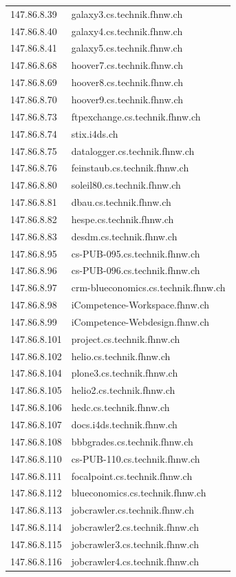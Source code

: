 \documentclass[11pt,a4paper]{scrartcl}
\begin{document}
\begin{longtable}{p{2.5cm}|p{7cm}}
	147.86.8.39 & galaxy3.cs.technik.fhnw.ch \\
	147.86.8.40 & galaxy4.cs.technik.fhnw.ch \\
	147.86.8.41 & galaxy5.cs.technik.fhnw.ch \\
	147.86.8.68 & hoover7.cs.technik.fhnw.ch \\
	147.86.8.69 & hoover8.cs.technik.fhnw.ch \\
	147.86.8.70 & hoover9.cs.technik.fhnw.ch \\
	147.86.8.73 & ftpexchange.cs.technik.fhnw.ch \\
	147.86.8.74 & stix.i4ds.ch \\
	147.86.8.75 & datalogger.cs.technik.fhnw.ch \\
	147.86.8.76 & feinstaub.cs.technik.fhnw.ch \\
	147.86.8.80 & soleil80.cs.technik.fhnw.ch \\
	147.86.8.81 & dbau.cs.technik.fhnw.ch \\
	147.86.8.82 & hespe.cs.technik.fhnw.ch \\
	147.86.8.83 & desdm.cs.technik.fhnw.ch \\
	147.86.8.95 & cs-PUB-095.cs.technik.fhnw.ch \\
	147.86.8.96 & cs-PUB-096.cs.technik.fhnw.ch \\
	147.86.8.97 & crm-blueconomics.cs.technik.fhnw.ch \\
	147.86.8.98 & iCompetence-Workspace.fhnw.ch \\
	147.86.8.99 & iCompetence-Webdesign.fhnw.ch \\
	147.86.8.101 & project.cs.technik.fhnw.ch \\
	147.86.8.102 & helio.cs.technik.fhnw.ch \\
	147.86.8.104 & plone3.cs.technik.fhnw.ch \\
	147.86.8.105 & helio2.cs.technik.fhnw.ch \\
	147.86.8.106 & hedc.cs.technik.fhnw.ch \\
	147.86.8.107 & docs.i4ds.technik.fhnw.ch \\
	147.86.8.108 & bbbgrades.cs.technik.fhnw.ch \\
	147.86.8.110 & cs-PUB-110.cs.technik.fhnw.ch \\
	147.86.8.111 & focalpoint.cs.technik.fhnw.ch \\
	147.86.8.112 & blueconomics.cs.technik.fhnw.ch \\
	147.86.8.113 & jobcrawler.cs.technik.fhnw.ch \\
	147.86.8.114 & jobcrawler2.cs.technik.fhnw.ch \\
	147.86.8.115 & jobcrawler3.cs.technik.fhnw.ch \\
	147.86.8.116 & jobcrawler4.cs.technik.fhnw.ch \\
\end{longtable}
\end{document}

